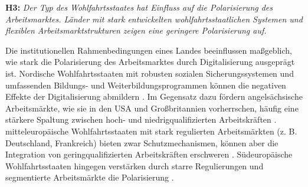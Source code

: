 \textbf{H3:} \textit{Der Typ des Wohlfahrtsstaates hat Einfluss auf die Polarisierung des 
Arbeitsmarktes. Länder mit stark entwickelten wohlfahrtsstaatlichen Systemen und flexiblen 
Arbeitsmarktstrukturen zeigen eine geringere Polarisierung auf.}

Die institutionellen Rahmenbedingungen eines Landes beeinflussen maßgeblich, wie stark die 
Polarisierung des Arbeitsmarktes durch Digitalisierung ausgeprägt ist. Nordische 
Wohlfahrtsstaaten mit robusten sozialen Sicherungssystemen und umfassenden Bildungs- und 
Weiterbildungsprogrammen können die negativen Effekte der Digitalisierung abmildern 
\parencite[vgl.][S. 27–28]{espingandersen1990thethree}. Im Gegensatz dazu fördern 
angelsächsische Arbeitsmärkte, wie sie in den USA und Großbritannien vorherrschen, häufig 
eine stärkere Spaltung zwischen hoch- und niedrigqualifizierten Arbeitskräften 
\parencite[vgl.][12–13]{goodin1999thereal}. mitteleuropäische Wohlfahrtsstaaten mit stark 
regulierten Arbeitsmärkten (z. B. Deutschland, Frankreich) bieten zwar Schutzmechanismen, 
können aber die Integration von geringqualifizierten Arbeitskräften erschweren 
\parencite[vgl.][S. 78]{hall2001varieties}. Südeuropäische Wohlfahrtsstaaten hingegen 
verstärken durch starre Regulierungen und segmentierte Arbeitsmärkte die Polarisierung 
\parencite[vgl.][S. 17–37]{ferrera1996thesouthern}.
